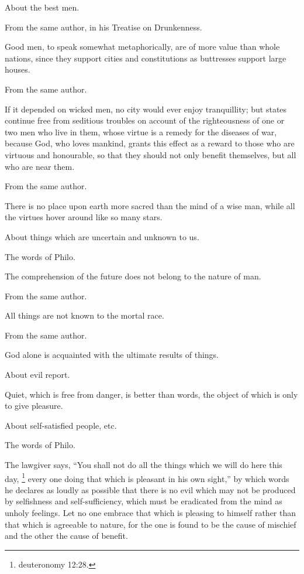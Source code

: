 About the best men.

From the same author, in his Treatise on Drunkenness.

Good men, to speak somewhat metaphorically, are of more value than whole nations, since they
support cities and constitutions as buttresses support large houses.

From the same author.

If it depended on wicked men, no city would ever enjoy tranquillity; but states continue free from
seditious troubles on account of the righteousness of one or two men who live in them, whose
virtue is a remedy for the diseases of war, because God, who loves mankind, grants this effect as
a reward to those who are virtuous and honourable, so that they should not only benefit
themselves, but all who are near them.

From the same author.

There is no place upon earth more sacred than the mind of a wise man, while all the virtues hover
around like so many stars.

About things which are uncertain and unknown to us.

The words of Philo.

The comprehension of the future does not belong to the nature of man.

From the same author.

All things are not known to the mortal race.

From the same author.

God alone is acquainted with the ultimate results of things.

About evil report.

Quiet, which is free from danger, is better than words, the object of which is only to give pleasure.

About self-satisfied people, etc.

The words of Philo.

The lawgiver says, ``You shall not do all the things which we will do here this day, \footnote{deuteronomy
12:28.} every one doing that which is pleasant in his own sight,'' by which words he declares as
loudly as possible that there is no evil which may not be produced by selfishness and
self-sufficiency, which must be eradicated from the mind as unholy feelings. Let no one embrace
that which is pleasing to himself rather than that which is agreeable to nature, for the one is found
to be the cause of mischief and the other the cause of benefit.

